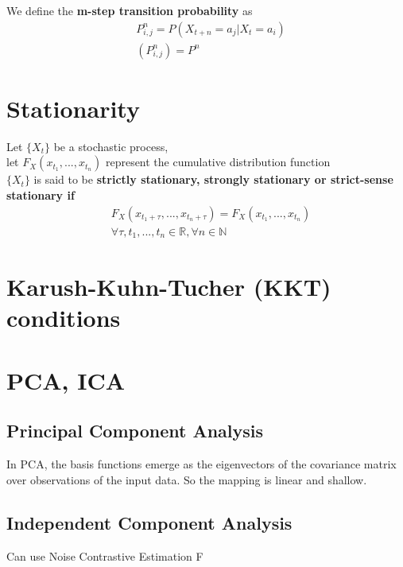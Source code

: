 \documentclass[../main.tex]{subfiles}
\begin{document}
We define the \textbf{m-step transition probability} as
\begin{align*}
    &P^n_{i,j} = P(X_{t+n} = a_j | X_{t} = a_i) \\
    &(P^n_{i, j}) = P^n
\end{align*}

\section{Stationarity}
Let $\{ X_t \}$ be a stochastic process, \\
let $F_X(x_{t_1}, ..., x_{t_n})$ represent the cumulative distribution function \\
$\{ X_t \}$ is said to be \textbf{strictly stationary, strongly stationary or strict-sense stationary if}
\begin{align*}
    &F_X(x_{t_1+\tau}, ..., x_{t_n+\tau}) = F_X(x_{t_1}, ..., x_{t_n}) \\
    &\forall \tau, t_1, ..., t_n \in \mathbb{R}, \forall n \in \mathbb{N}
\end{align*}

\section{Karush-Kuhn-Tucher (KKT) conditions}


\section{PCA, ICA}
\subsection{Principal Component Analysis}
In PCA, the basis functions emerge as the eigenvectors of the covariance matrix over observations of
the input data. So the mapping is linear and shallow.

\subsection{Independent Component Analysis}
Can use Noise Contrastive Estimation
F
\end{document}
